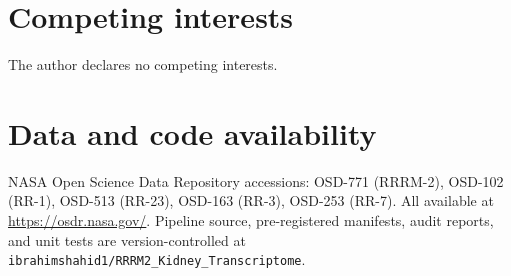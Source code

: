 \documentclass[11pt]{article}
\newcommand{\code}[1]{\texttt{#1}}
\begin{document}
\section*{Competing interests}
The author declares no competing interests.

\section*{Data and code availability}
NASA Open Science Data Repository accessions: OSD-771 (RRRM-2), OSD-102 (RR-1), OSD-513 (RR-23), OSD-163 (RR-3), OSD-253 (RR-7). All available at \url{https://osdr.nasa.gov/}. Pipeline source, pre-registered manifests, audit reports, and unit tests are version-controlled at \code{ibrahimshahid1/RRRM2\_Kidney\_Transcriptome}.

\end{document}
